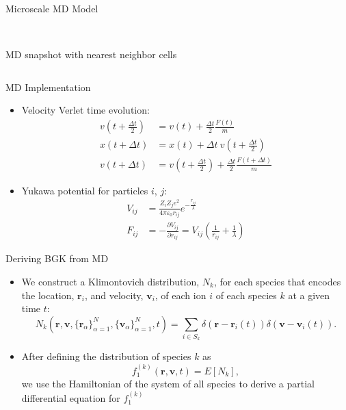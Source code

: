 \documentclass{beamer}
\begin{document}
\begin{frame}[t]{Microscale MD Model}
\begin{itemize}
\begin{columns}
\begin{column}{0.4\textwidth}
\begin{center}
						\\\tiny MD snapshot with nearest neighbor cells
					\end{center}
				\end{column}
			\end{columns}
		\end{itemize}
	\end{frame}
	
	\begin{frame}{MD Implementation}
		\begin{itemize}
			\item  Velocity Verlet time evolution:\vspace{-0.2em}
			\small\begin{align*}
			v\left(t+\frac{\Delta t}{2}\right) &= v(t) + \frac{\Delta t}{2}\frac{F(t)}{m} \\
			x(t+\Delta t) &= x(t) + \Delta t\:v\left(t+\frac{\Delta t}{2}\right) \\
			v(t+\Delta t) &= v\left(t+\frac{\Delta t}{2}\right) + \frac{\Delta t}{2}\frac{F(t+\Delta t)}{m}
			\end{align*}\normalsize
			\item  Yukawa potential for particles $i$, $j$:\vspace{-0.2em}
			\small\begin{align*}
			V_{ij} &= \frac{Z_iZ_je^2}{4\pi\varepsilon_0r_{ij}}e^{-\frac{r_{ij}}{\lambda}} \\
			F_{ij} &= -\frac{\partial V_{ij}}{\partial r_{ij}} = V_{ij}\left(\frac{1}{r_{ij}}+\frac{1}{\lambda}\right)
			\end{align*}\normalsize
		\end{itemize}
	\let\thefootnote\relax{}
	\end{frame}
	
	\begin{frame}{Deriving BGK from MD}
		\begin{itemize}
			\item  We construct a Klimontovich distribution, $N_k$, for each species that encodes the location, $\mathbf{r}_i$, and velocity, $\mathbf{v}_i$, of each ion $i$ of each species $k$ at a given time $t$:
			\begin{equation*}
				N_k(\mathbf{r},\mathbf{v},\{\mathbf{r}_\alpha\}_{\alpha=1}^{N},\{\mathbf{v}_\alpha\}_{\alpha=1}^{N},t) = \sum_{i\in S_k}\delta\left(\mathbf{r}-\mathbf{r}_i(t)\right)\delta\left(\mathbf{v}-\mathbf{v}_i(t)\right).
			\end{equation*}
			\item After defining the distribution of species $k$ as 
			\[f_1^{(k)}(\mathbf{r},\mathbf{v},t)=E[N_k],\]
			we use the Hamiltonian of the system of all species to derive a partial differential equation for $f_1^{(k)}$
		\end{itemize}
	\end{frame}
	
\end{document}
